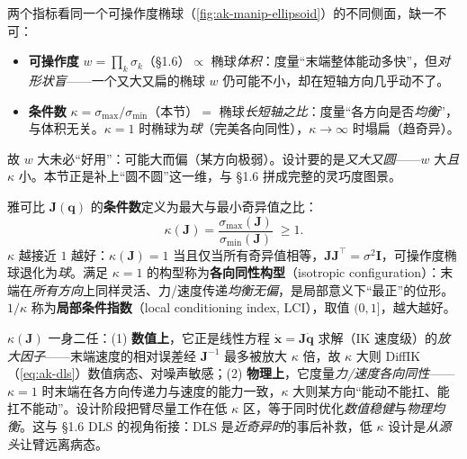 \begin{insight}\label{ins:ak-design-vs-manip}
两个指标看同一个可操作度椭球（\cref{fig:ak-manip-ellipsoid}）的不同侧面，缺一不可：
\begin{itemize}
  \item \textbf{可操作度} $w=\prod_k\sigma_k$（§1.6）$\propto$ 椭球\emph{体积}：度量“末端整体能动多快”，但\emph{对形状盲}——一个又大又扁的椭球 $w$ 仍可能不小，却在短轴方向几乎动不了。
  \item \textbf{条件数} $\kappa=\sigma_{\max}/\sigma_{\min}$（本节）$=$ 椭球\emph{长短轴之比}：度量“各方向是否\emph{均衡}”，与体积无关。$\kappa=1$ 时椭球为\emph{球}（完美各向同性），$\kappa\to\infty$ 时塌扁（趋奇异）。
\end{itemize}
故 $w$ 大未必“好用”：可能大而偏（某方向极弱）。设计要的是\emph{又大又圆}——$w$ 大\emph{且} $\kappa$ 小。本节正是补上“圆不圆”这一维，与 §1.6 拼成完整的灵巧度图景。
\end{insight}

\begin{definition}[雅可比条件数与各向同性构型]\label{def:ak-condition-number}
雅可比 $\mathbf{J}(\mathbf{q})$ 的\textbf{条件数}定义为最大与最小奇异值之比\cite{angeles2014fundamentals}：
\begin{equation}
  \boxed{\kappa(\mathbf{J})=\frac{\sigma_{\max}(\mathbf{J})}{\sigma_{\min}(\mathbf{J})}\;\ge 1.}
  \label{eq:ak-condition-number}
\end{equation}
$\kappa$ 越接近 $1$ 越好：$\kappa(\mathbf{J})=1$ 当且仅当所有奇异值相等，$\mathbf{J}\mathbf{J}^\top=\sigma^2\mathbf{I}$，可操作度椭球退化为\emph{球}。满足 $\kappa=1$ 的构型称为\textbf{各向同性构型}（isotropic configuration）：末端在\emph{所有方向}上同样灵活、力/速度传递\emph{均衡无偏}，是局部意义下“最正”的位形。$1/\kappa$ 称为\textbf{局部条件指数}（local conditioning index, LCI），取值 $(0,1]$，越大越好。
\end{definition}

\begin{insight}[条件数为何兼管“数值”与“物理”]\label{ins:ak-condition-dual}
$\kappa(\mathbf{J})$ 一身二任\cite{angeles2014fundamentals}：(1) \textbf{数值上}，它正是线性方程 $\dot{\mathbf{x}}=\mathbf{J}\dot{\mathbf{q}}$ 求解（IK 速度级）的\emph{放大因子}——末端速度的相对误差经 $\mathbf{J}^{-1}$ 最多被放大 $\kappa$ 倍，故 $\kappa$ 大则 DiffIK（\cref{eq:ak-dls}）数值病态、对噪声敏感；(2) \textbf{物理上}，它度量\emph{力/速度各向同性}——$\kappa=1$ 时末端在各方向传递力与速度的能力一致，$\kappa$ 大则某方向“能动不能扛、能扛不能动”。设计阶段把臂尽量工作在低 $\kappa$ 区，等于同时优化\emph{数值稳健}与\emph{物理均衡}。这与 §1.6 DLS 的视角衔接：DLS 是\emph{近奇异时}的事后补救，低 $\kappa$ 设计是\emph{从源头}让臂远离病态。
\end{insight}

